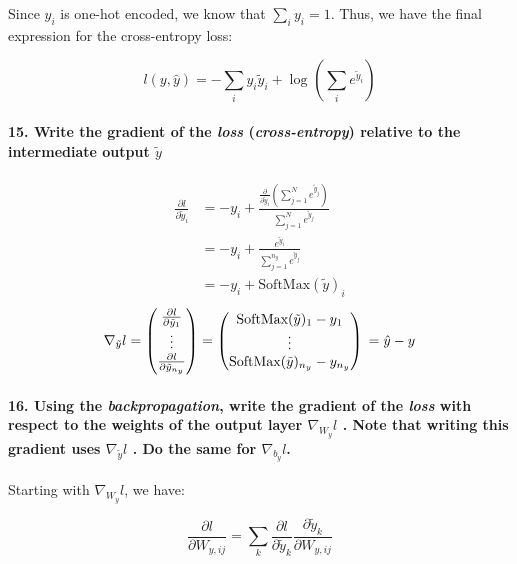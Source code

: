 \documentclass{article}
\theoremstyle{plain}%
\theoremstyle{definition}
\theoremstyle{remark}
\begin{document}
Since $y_i$ is one-hot encoded, we know that $\sum_i y_i = 1$. Thus, we have the final expression for the cross-entropy loss:

$$ l(y, \hat{y}) = - \sum_{i}^{} y_i \tilde{y}_i + \log_{} \left(\sum_{i}^{} e^{\tilde{y}_i}\right) $$

\paragraph{15. Write the gradient of the \textit{loss} (\textit{cross-entropy}) relative to the intermediate output $ \tilde{y} $ }
\begin{align*}
    \frac{\partial l}{\partial \tilde{y}_i} & = -y_i + \frac{\frac{\partial }{\partial \tilde{y}_i } (\sum_{j=1}^{N} e^{ \tilde{y}_j })}{\sum_{j=1}^{N} e^{ \tilde{y}_j }} \\
                                            & = - y_i + \frac{e^{\tilde{y}_i}}{\sum_{j=1}^{n_y} e^{ \tilde{y}_j}}                                                          \\
                                            & = - y_i + \text{SoftMax}(\tilde{y})_i
\end{align*}
\[
    \nabla _{\tilde{y}}l = \begin{pmatrix}
        \frac{\partial l}{\partial \tilde{y}_1} \\
        \vdots                                  \\
        \frac{\partial l}{\partial \tilde{y}_{n_y}}
    \end{pmatrix} = \begin{pmatrix}
        \text{SoftMax}(\tilde{y})_1 - y_1 \\
        \vdots                            \\
        \text{SoftMax}(\tilde{y})_{n_y} - y_{n_y}
    \end{pmatrix} \\
    = \hat{y} - y
\]

\paragraph{16. Using the \textit{backpropagation}, write the gradient of the \textit{loss} with respect to the weights of the output layer $ \nabla _{W_y}l $ . Note that writing this gradient uses $ \nabla _{\tilde{y}}l $ . Do the same for $ \nabla _{b_y}l $.}

Starting with \( \nabla _{W_y} l \), we have:

\[
    \frac{\partial l}{\partial W_{y,ij}} = \sum_{k}^{} \frac{\partial l}{\partial \tilde{y}_k} \frac{\partial \tilde{y}_k}{\partial W_{y,ij}}
\]
\end{document}
